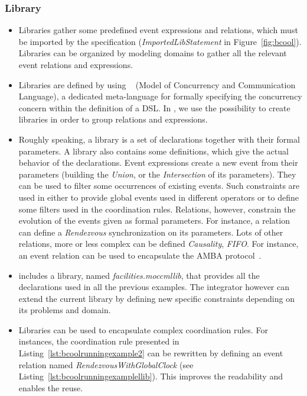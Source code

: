 \subsubsection{Library}
\label{subsec:bcoollib}

\begin{itemize}
	\item Libraries gather some predefined event expressions and relations, which must be imported by the specification (\emph{ImportedLibStatement} in Figure~\ref{fig:bcool}). Libraries can be organized by modeling domains to gather all the relevant event relations and expressions. 
	
	\item Libraries are defined by using \moccml~\cite{moccmlbib} (Model of Concurrency and Communication Language), a dedicated meta-language for formally specifying the concurrency concern	within the definition of a DSL. In \bcool, we use the possibility to create libraries in order to group relations and expressions. 
	
	\item Roughly speaking, a \moccml library is a set of declarations together with their formal parameters. A library also contains some definitions, which give the actual behavior of the declarations. Event expressions create a new event from their parameters (\eg building the \textit{Union}, or the \textit{Intersection} of its parameters). They can be used to filter some occurrences of existing events. Such constraints are used in \bcool either to provide global events used in different operators or to define some filters used in the coordination rules. Relations, however, constrain the evolution of the events given as formal parameters. For instance, a relation can define a \textit{Rendezvous} synchronization on its parameters. Lots of other relations, more or less complex can be defined \eg \textit{Causality}, \textit{FIFO}. For instance, an event relation can be used to encapsulate the AMBA protocol~\cite{ambabus}. 
	
	\item \bcool includes a library, named \emph{facilities.moccmllib}, that provides all the declarations used in all the previous examples. The integrator however can extend the current library by defining new specific constraints depending on its problems and domain. 

	\item Libraries can be used to encapsulate complex coordination rules. For instances, the coordination rule presented in Listing~\ref{lst:bcoolrunningexample2} can be rewritten by defining an event relation named \emph{RendezvousWithGlobalClock} (see Listing~\ref{lst:bcoolrunningexamplellib}). This improves the readability and enables the reuse.     
	

\end{itemize}
